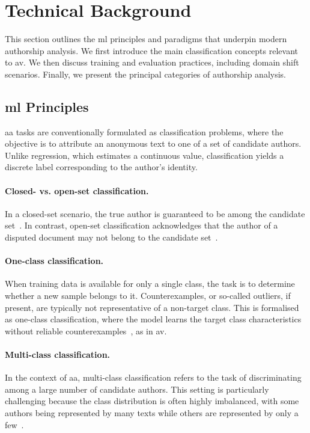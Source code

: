 \section{Technical Background}

This section outlines the \ac{ml} principles and paradigms that underpin modern authorship analysis. 
We first introduce the main classification concepts relevant to \ac{av}. 
We then discuss training and evaluation practices, including domain shift scenarios. 
Finally, we present the principal categories of authorship analysis.

\subsection{\acl{ml} Principles}

\ac{aa} tasks are conventionally formulated as classification problems, where the objective is to attribute an anonymous text to one of a set of candidate authors. 
Unlike regression, which estimates a continuous value, classification yields a discrete label corresponding to the author’s identity.

\paragraph{Closed- vs. open-set classification.} 
In a closed-set scenario, the true author is guaranteed to be among the candidate set~\citep{koppel_authorship_2011}. 
In contrast, open-set classification acknowledges that the author of a disputed document may not belong to the candidate set~\citep{stamatatos_survey_2009}. 

\paragraph{One-class classification.} 
When training data is available for only a single class, the task is to determine whether a new sample belongs to it. 
Counterexamples, or so-called outliers, if present, are typically not representative of a non-target class. 
This is formalised as one-class classification, where the model learns the target class characteristics without reliable counterexamples~\citep{stein_intrinsic_2011,koppel_authorship_2004}, as in \ac{av}.

\paragraph{Multi-class classification.} 
In the context of \ac{aa}, multi-class classification refers to the task of discriminating among a large number of candidate authors. 
This setting is particularly challenging because the class distribution is often highly imbalanced, with some authors being represented by many texts while others are represented by only a few~\citep{stamatatos_survey_2009,koppel_authorship_2004,elmanarelbouanani_authorship_2014}. 


